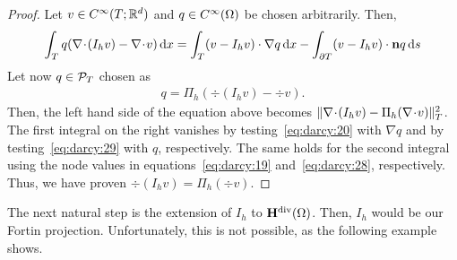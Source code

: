 \begin{proof}
  Let $v\in C^\infty(T;\mathbb R^d)$ and $q\in C^\infty(\Omega)$ be
  chosen arbitrarily. Then,
  \begin{gather}
    \int_T q(\nabla\!\cdot\! (I_h v) - \nabla\!\cdot\! v)\,\mathrm{d} x
    = \int_T(v-I_h v) \cdot \nabla q\,\mathrm{d} x
    - \int_{\partial T} (v-I_h v)\cdot\mathbf n q \,\mathrm{d} s
  \end{gather}
  Let now $q\in \mathcal P_T$ chosen as
  \begin{gather}
    q = \Pi_h (\div (I_h v) - \div v).
  \end{gather}
  Then, the left hand side of the equation above becomes
  $\lVert\nabla\!\cdot\!(I_h v) - \Pi_h(\nabla\!\cdot\! v)\rVert_T^2$. The first integral on
  the right vanishes by testing~\eqref{eq:darcy:20} with
  $\nabla q$ and by testing~\eqref{eq:darcy:29} with $q$,
  respectively.
  The same holds for the second integral using the node values in
  equations~\eqref{eq:darcy:19} and~\eqref{eq:darcy:28},
  respectively. Thus, we have proven $\div (I_h v) = \Pi_h(\div v)$.
\end{proof}

\begin{remark}
  The next natural step is the extension of $I_h$ to
  $\mathbf H^{\text{div}}(\Omega)$. Then, $I_h$ would be our Fortin
  projection. Unfortunately, this is not possible, as the following
  example shows.
\end{remark}

